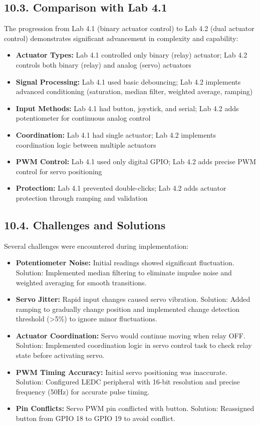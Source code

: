 \documentclass[12pt]{article}
\begin{document}
\subsection*{10.3. Comparison with Lab 4.1}

The progression from Lab 4.1 (binary actuator control) to Lab 4.2 (dual actuator control) demonstrates significant advancement in complexity and capability:

\begin{itemize}
    \item \textbf{Actuator Types:} Lab 4.1 controlled only binary (relay) actuator; Lab 4.2 controls both binary (relay) and analog (servo) actuators
    \item \textbf{Signal Processing:} Lab 4.1 used basic debouncing; Lab 4.2 implements advanced conditioning (saturation, median filter, weighted average, ramping)
    \item \textbf{Input Methods:} Lab 4.1 had button, joystick, and serial; Lab 4.2 adds potentiometer for continuous analog control
    \item \textbf{Coordination:} Lab 4.1 had single actuator; Lab 4.2 implements coordination logic between multiple actuators
    \item \textbf{PWM Control:} Lab 4.1 used only digital GPIO; Lab 4.2 adds precise PWM control for servo positioning
    \item \textbf{Protection:} Lab 4.1 prevented double-clicks; Lab 4.2 adds actuator protection through ramping and validation
\end{itemize}

\subsection*{10.4. Challenges and Solutions}

Several challenges were encountered during implementation:

\begin{itemize}
    \item \textbf{Potentiometer Noise:} Initial readings showed significant fluctuation. Solution: Implemented median filtering to eliminate impulse noise and weighted averaging for smooth transitions.
    \item \textbf{Servo Jitter:} Rapid input changes caused servo vibration. Solution: Added ramping to gradually change position and implemented change detection threshold (>5\%) to ignore minor fluctuations.
    \item \textbf{Actuator Coordination:} Servo would continue moving when relay OFF. Solution: Implemented coordination logic in servo control task to check relay state before activating servo.
    \item \textbf{PWM Timing Accuracy:} Initial servo positioning was inaccurate. Solution: Configured LEDC peripheral with 16-bit resolution and precise frequency (50Hz) for accurate pulse timing.
    \item \textbf{Pin Conflicts:} Servo PWM pin conflicted with button. Solution: Reassigned button from GPIO 18 to GPIO 19 to avoid conflict.
\end{itemize}
\end{document}
